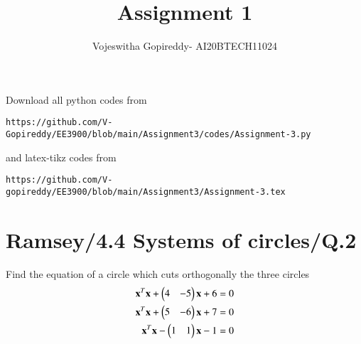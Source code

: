 \documentclass[journal,12pt,twocolumn]{IEEEtran}
\begin{document}
     \def\centbox#1{\makebox[0in]{#1}}
     \def\topbox#1{\raisebox{-\baselineskip}[0in][0in]{#1}}
     \def\midbox#1{\raisebox{-0.5\baselineskip}[0in][0in]{#1}}
\vspace{3cm}
\title{Assignment 1}
\author{Vojeswitha Gopireddy- AI20BTECH11024}
\maketitle
\newpage
\bigskip
\renewcommand{\thefigure}{\theenumi}
\renewcommand{\thetable}{\theenumi}
Download all python codes from 
\begin{lstlisting}
https://github.com/V-Gopireddy/EE3900/blob/main/Assignment3/codes/Assignment-3.py
\end{lstlisting}
%
and latex-tikz codes from 
%
\begin{lstlisting}
https://github.com/V-gopireddy/EE3900/blob/main/Assignment3/Assignment-3.tex
\end{lstlisting}

\section{Ramsey/4.4 Systems of circles/Q.2}
Find the equation of a circle which cuts orthogonally the three circles
\begin{align}
    \mathbf{x}^T\mathbf{x} + \begin{pmatrix}4&-5\end{pmatrix}\mathbf{x} + 6 = 0\label{circle1}\\
    \mathbf{x}^T\mathbf{x} + \begin{pmatrix}5&-6\end{pmatrix}\mathbf{x} + 7 = 0\label{circle2}\\
    \mathbf{x}^T\mathbf{x} - \begin{pmatrix}1&1\end{pmatrix}\mathbf{x} - 1 = 0\label{circle3}
\end{align}
\end{document}
